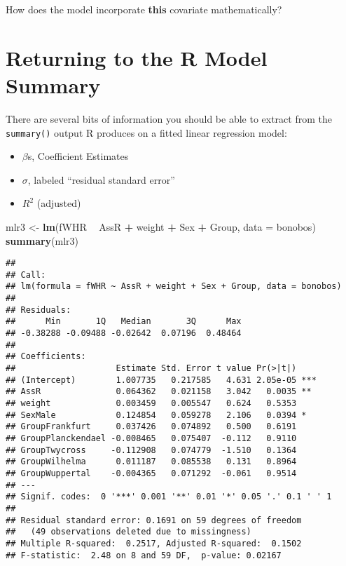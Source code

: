\documentclass[]{book}
\newenvironment{Shaded}{\begin{snugshade}}{\end{snugshade}}
\newcommand{\DataTypeTok}[1]{\textcolor[rgb]{0.13,0.29,0.53}{#1}}
\newcommand{\KeywordTok}[1]{\textcolor[rgb]{0.13,0.29,0.53}{\textbf{#1}}}
\newcommand{\NormalTok}[1]{#1}
\newcommand{\OperatorTok}[1]{\textcolor[rgb]{0.81,0.36,0.00}{\textbf{#1}}}
\newcommand{\StringTok}[1]{\textcolor[rgb]{0.31,0.60,0.02}{#1}}
\begin{document}
How does the model incorporate \textbf{this} covariate mathematically?

\vspace{1.75in}

\hypertarget{returning-to-the-r-model-summary}{%
\section{Returning to the R Model Summary}\label{returning-to-the-r-model-summary}}

There are several bits of information you should be able to extract from the \texttt{summary()} output R produces on a fitted linear regression model:

\begin{itemize}
\item
  \(\beta\)s, Coefficient Estimates
\item
  \(\sigma\), labeled ``residual standard error''
  \vspace{2.5in}
\item
  \(R^2\) (adjusted)
\end{itemize}

\vspace{2.5in}

\begin{Shaded}
\begin{Highlighting}[]
\NormalTok{mlr3 <-}\StringTok{ }\KeywordTok{lm}\NormalTok{(fWHR }\OperatorTok{~}\StringTok{ }\NormalTok{AssR }\OperatorTok{+}\StringTok{ }\NormalTok{weight }\OperatorTok{+}\StringTok{ }\NormalTok{Sex }\OperatorTok{+}\StringTok{ }\NormalTok{Group, }\DataTypeTok{data =}\NormalTok{ bonobos)}
\KeywordTok{summary}\NormalTok{(mlr3)}
\end{Highlighting}
\end{Shaded}

\begin{verbatim}
## 
## Call:
## lm(formula = fWHR ~ AssR + weight + Sex + Group, data = bonobos)
## 
## Residuals:
##      Min       1Q   Median       3Q      Max 
## -0.38288 -0.09488 -0.02642  0.07196  0.48464 
## 
## Coefficients:
##                    Estimate Std. Error t value Pr(>|t|)    
## (Intercept)        1.007735   0.217585   4.631 2.05e-05 ***
## AssR               0.064362   0.021158   3.042   0.0035 ** 
## weight             0.003459   0.005547   0.624   0.5353    
## SexMale            0.124854   0.059278   2.106   0.0394 *  
## GroupFrankfurt     0.037426   0.074892   0.500   0.6191    
## GroupPlanckendael -0.008465   0.075407  -0.112   0.9110    
## GroupTwycross     -0.112908   0.074779  -1.510   0.1364    
## GroupWilhelma      0.011187   0.085538   0.131   0.8964    
## GroupWuppertal    -0.004365   0.071292  -0.061   0.9514    
## ---
## Signif. codes:  0 '***' 0.001 '**' 0.01 '*' 0.05 '.' 0.1 ' ' 1
## 
## Residual standard error: 0.1691 on 59 degrees of freedom
##   (49 observations deleted due to missingness)
## Multiple R-squared:  0.2517, Adjusted R-squared:  0.1502 
## F-statistic:  2.48 on 8 and 59 DF,  p-value: 0.02167
\end{verbatim}
\end{document}
